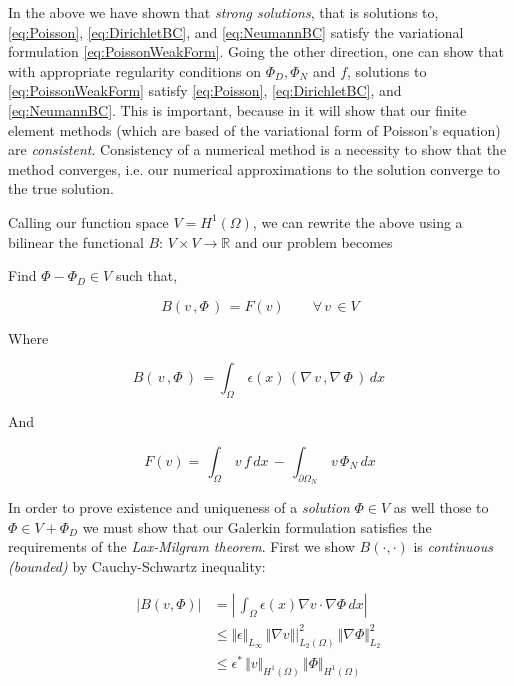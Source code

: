 \documentclass[10pt]{report}
\numberwithin{equation}{section}
\begin{document}
In the above we have shown that \textit{strong solutions}, that is solutions to, \eqref{eq:Poisson}, \eqref{eq:DirichletBC}, and \eqref{eq:NeumannBC} satisfy the variational formulation \eqref{eq:PoissonWeakForm}.  Going the other direction, one can show that with appropriate regularity conditions on $\Phi_{D}, \Phi_{N}$ and $f$,  solutions to \eqref{eq:PoissonWeakForm} satisfy \eqref{eq:Poisson}, \eqref{eq:DirichletBC}, and \eqref{eq:NeumannBC}.  This is important, because in it will show that our finite element methods (which are based of the variational form of Poisson's equation) are \textit{consistent}.  Consistency of a numerical method is a necessity to show that the method converges, i.e. our numerical approximations to the solution converge to the true solution.  


\vspace{5mm}

\noindent
Calling our function space $V = H^{1}(\Omega)$, we can rewrite the above using a bilinear the functional $B: \, V \times V \rightarrow \mathbb{R}$ and our problem becomes

\begin{center}
Find $\Phi - \Phi_{D} \in V $ such that,
\end{center}

\begin{equation}\label{eq:PoissonBilinear}
B \left( v \, , \Phi \, \right) \,  
=  F(v) \qquad \forall \,  v  \, \in  V 
\end{equation}


\noindent
Where 

$$B\left( \, v \, , \Phi \, \right) \, =
  \int_{\Omega} \, \epsilon(x) \, \left( \nabla \, v \, ,  \nabla  \, \Phi  \,
 \right) \, dx \, $$ 
 
 
\noindent
And 


$$ F(v)  =  \, \int_{\Omega} \, v \,  f  \, dx   \, - \, \int_{\partial \Omega_{N}} \,  v  \, \Phi_{N} \, dx$$


In order to prove existence and uniqueness of a \textit{solution} $\Phi  \in V$ as well those to $\Phi \in V + \Phi_{D}$ we must show that our Galerkin formulation satisfies the requirements of the \textit{Lax-Milgram theorem}.  First we show $B(\cdot, \cdot) $ is \textit{continuous (bounded)} by Cauchy-Schwartz inequality:



\begin{align*}
|B(v , \Phi)| &= \left\vert \, \int_{\Omega} \epsilon(x) \nabla v \cdot \nabla \Phi \, dx \right\vert  \\
&\leq \Vert \epsilon \Vert_{L_{\infty}} \, \Vert \nabla v \Vert|^{2}_{L_{2}(\Omega)} \, \Vert \nabla \Phi \Vert^{2}_{L_{2}} \,  \\
&\leq  \epsilon^{*} \,  \Vert v \Vert_{H^{1}(\Omega)} \, \Vert \Phi \Vert_{H^{1}(\Omega)} 
\end{align*}
\end{document}
